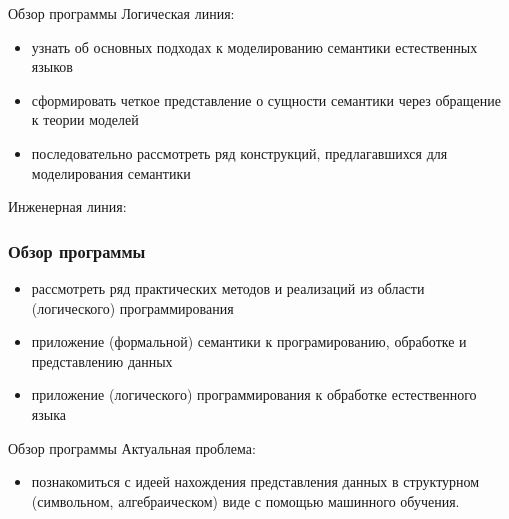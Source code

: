 \documentclass{beamer}
\begin{document}
\begin{frame}{Обзор программы}
Логическая линия:\bigskip
\begin{itemize}
  \item узнать об основных подходах к моделированию семантики естественных языков
  \item сформировать четкое представление о сущности семантики через обращение к теории моделей
  \item последовательно рассмотреть ряд конструкций, предлагавшихся для моделирования семантики
\end{itemize}
\end{frame}

\begin{frame}[fragile]
Инженерная линия:\bigskip
\frametitle{Обзор программы}
\begin{itemize}
  \item рассмотреть ряд практических методов и реализаций из области (логического) программирования
  \item приложение (формальной) семантики к програмированию, обработке и представлению данных
  \item приложение (логического) программирования к обработке естественного языка
\end{itemize}
\end{frame}

\begin{frame}{Обзор программы}
Актуальная проблема:\bigskip 
\begin{itemize}
  \item познакомиться с идеей нахождения представления данных в структурном (символьном, алгебраическом) виде с помощью машинного обучения.
\end{itemize}
\end{frame}
\end{document}
